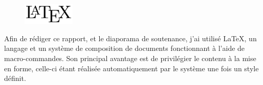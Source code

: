 \begin{figure}
	\includegraphics[width=2.5cm]{contents/images/logoLatex.png}
\end{figure}
Afin de rédiger ce rapport, et le diaporama de soutenance, j'ai utilisé \LaTeX{}, un langage et un système de composition de documents fonctionnant à l'aide de
macro-commandes. Son principal avantage est de privilégier le contenu à la mise en forme, celle-ci étant réalisée automatiquement par le système une fois un style définit. 
